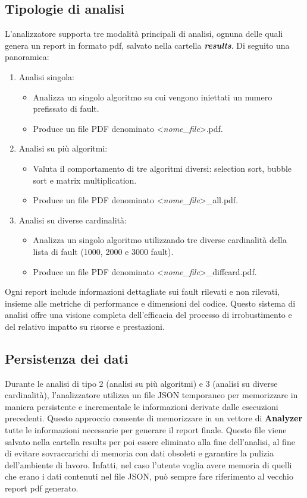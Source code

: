 \subsection{Tipologie di analisi}
L'analizzatore supporta tre modalità principali di analisi, ognuna delle quali genera un report in formato pdf, salvato nella cartella \textit{\textbf{results}}. Di seguito una panoramica:
\begin{enumerate}
\item Analisi singola:
    \begin{itemize}
        \item Analizza un singolo algoritmo su cui vengono iniettati un     numero prefissato di fault.
        \item Produce un file PDF denominato \textless \textit{nome\_file}\textgreater.pdf.
    \end{itemize}

\item Analisi su più algoritmi:
    \begin{itemize}
        \item Valuta il comportamento di tre algoritmi diversi: selection sort, bubble sort e matrix multiplication.
        \item Produce un file PDF denominato \textless \textit{nome\_file}\textgreater\_all.pdf.
    \end{itemize}

\item Analisi su diverse cardinalità:
    \begin{itemize}
        \item Analizza un singolo algoritmo utilizzando tre diverse cardinalità della lista di fault (1000, 2000 e 3000 fault).
        \item Produce un file PDF denominato \textless \textit{nome\_file}\textgreater\_diffcard.pdf.
    \end{itemize}
\end{enumerate}
Ogni report include informazioni dettagliate sui fault rilevati e non rilevati, insieme alle metriche di performance e dimensioni del codice. Questo sistema di analisi offre una visione completa dell'efficacia del processo di irrobustimento e del relativo impatto su risorse e prestazioni.

\subsection{Persistenza dei dati}
Durante le analisi di tipo 2 (analisi su più algoritmi) e 3 (analisi su diverse cardinalità), l'analizzatore utilizza un file JSON temporaneo per memorizzare in maniera persistente e incrementale le informazioni derivate dalle esecuzioni precedenti. Questo approccio consente di memorizzare in un vettore di \textbf{Analyzer} tutte le informazioni necessarie per generare il report finale.
Questo file viene salvato nella cartella results per poi essere eliminato alla fine dell'analisi, al fine di evitare sovraccarichi di memoria con dati obsoleti e garantire la pulizia dell'ambiente di lavoro. Infatti, nel caso l'utente voglia avere memoria di quelli che erano i dati contenuti nel file JSON, può sempre fare riferimento al vecchio report pdf generato.